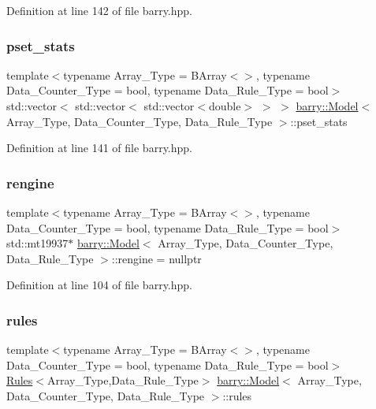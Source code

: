 Definition at line 142 of file barry.\+hpp.

\mbox{\label{classbarry_1_1_model_a3763f129965942611eb58e9779336f34}} 
\subsubsection{\texorpdfstring{pset\+\_\+stats}{pset\_stats}}
{\footnotesize\ttfamily template$<$typename Array\+\_\+\+Type  = B\+Array$<$$>$, typename Data\+\_\+\+Counter\+\_\+\+Type  = bool, typename Data\+\_\+\+Rule\+\_\+\+Type  = bool$>$ \\
std\+::vector$<$ std\+::vector$<$ std\+::vector$<$double$>$ $>$ $>$ \hyperlink{classbarry_1_1_model}{barry\+::\+Model}$<$ Array\+\_\+\+Type, Data\+\_\+\+Counter\+\_\+\+Type, Data\+\_\+\+Rule\+\_\+\+Type $>$\+::pset\+\_\+stats}



Definition at line 141 of file barry.\+hpp.

\mbox{\label{classbarry_1_1_model_adc85f6765d272293333a83bc2a4e90d2}} 
\subsubsection{\texorpdfstring{rengine}{rengine}}
{\footnotesize\ttfamily template$<$typename Array\+\_\+\+Type  = B\+Array$<$$>$, typename Data\+\_\+\+Counter\+\_\+\+Type  = bool, typename Data\+\_\+\+Rule\+\_\+\+Type  = bool$>$ \\
std\+::mt19937$\ast$ \hyperlink{classbarry_1_1_model}{barry\+::\+Model}$<$ Array\+\_\+\+Type, Data\+\_\+\+Counter\+\_\+\+Type, Data\+\_\+\+Rule\+\_\+\+Type $>$\+::rengine = nullptr}



Definition at line 104 of file barry.\+hpp.

\mbox{\label{classbarry_1_1_model_a53e5242ce0ed2bc7194a0662d09493f2}} 
\subsubsection{\texorpdfstring{rules}{rules}}
{\footnotesize\ttfamily template$<$typename Array\+\_\+\+Type  = B\+Array$<$$>$, typename Data\+\_\+\+Counter\+\_\+\+Type  = bool, typename Data\+\_\+\+Rule\+\_\+\+Type  = bool$>$ \\
\hyperlink{classbarry_1_1_rules}{Rules}$<$Array\+\_\+\+Type,Data\+\_\+\+Rule\+\_\+\+Type$>$ \hyperlink{classbarry_1_1_model}{barry\+::\+Model}$<$ Array\+\_\+\+Type, Data\+\_\+\+Counter\+\_\+\+Type, Data\+\_\+\+Rule\+\_\+\+Type $>$\+::rules}



